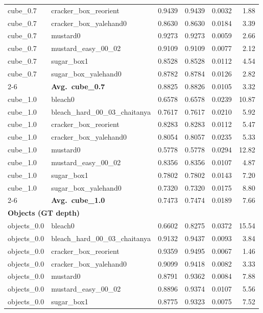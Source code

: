 \begin{longtable}{llrrrr}
  cube_0.7 & cracker\_box\_reorient & 0.9439 & 0.9439 & 0.0032 & 1.88 \\
  cube_0.7 & cracker\_box\_yalehand0 & 0.8630 & 0.8630 & 0.0184 & 3.39 \\
  cube_0.7 & mustard0 & 0.9273 & 0.9273 & 0.0059 & 2.66 \\
  cube_0.7 & mustard\_easy\_00\_02 & 0.9109 & 0.9109 & 0.0077 & 2.12 \\
  cube_0.7 & sugar\_box1 & 0.8528 & 0.8528 & 0.0112 & 4.54 \\
  cube_0.7 & sugar\_box\_yalehand0 & 0.8782 & 0.8784 & 0.0126 & 2.82 \\
  \cmidrule{2-6}
  & \textbf{Avg.~cube_0.7} & 0.8825 & 0.8826 & 0.0105 & 3.32 \\
  \midrule
  cube_1.0 & bleach0 & 0.6578 & 0.6578 & 0.0239 & 10.87 \\
  cube_1.0 & bleach\_hard\_00\_03\_chaitanya & 0.7617 & 0.7617 & 0.0210 & 5.92 \\
  cube_1.0 & cracker\_box\_reorient & 0.8283 & 0.8283 & 0.0112 & 5.47 \\
  cube_1.0 & cracker\_box\_yalehand0 & 0.8054 & 0.8057 & 0.0235 & 5.33 \\
  cube_1.0 & mustard0 & 0.5778 & 0.5778 & 0.0294 & 12.82 \\
  cube_1.0 & mustard\_easy\_00\_02 & 0.8356 & 0.8356 & 0.0107 & 4.87 \\
  cube_1.0 & sugar\_box1 & 0.7802 & 0.7802 & 0.0143 & 7.20 \\
  cube_1.0 & sugar\_box\_yalehand0 & 0.7320 & 0.7320 & 0.0175 & 8.80 \\
  \cmidrule{2-6}
  & \textbf{Avg.~cube_1.0} & 0.7473 & 0.7474 & 0.0189 & 7.66 \\
  \midrule
\multicolumn{6}{l}{\textbf{Objects (GT depth)}} \\
\midrule
  objects_0.0 & bleach0 & 0.6602 & 0.8275 & 0.0372 & 15.54 \\
  objects_0.0 & bleach\_hard\_00\_03\_chaitanya & 0.9132 & 0.9437 & 0.0093 & 3.84 \\
  objects_0.0 & cracker\_box\_reorient & 0.9359 & 0.9495 & 0.0067 & 1.46 \\
  objects_0.0 & cracker\_box\_yalehand0 & 0.9099 & 0.9418 & 0.0082 & 3.33 \\
  objects_0.0 & mustard0 & 0.8791 & 0.9362 & 0.0084 & 7.88 \\
  objects_0.0 & mustard\_easy\_00\_02 & 0.8896 & 0.9374 & 0.0107 & 5.56 \\
  objects_0.0 & sugar\_box1 & 0.8775 & 0.9323 & 0.0075 & 7.52 \\

\end{longtable}
